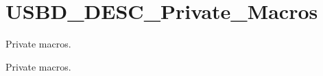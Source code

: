 \hypertarget{group___u_s_b_d___d_e_s_c___private___macros}{
\section{USBD\_\-DESC\_\-Private\_\-Macros}
\label{group___u_s_b_d___d_e_s_c___private___macros}
}
Private macros.  


Private macros. 